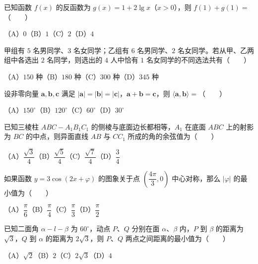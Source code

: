 \begin{question}
已知函数 $f(x)$ 的反函数为 $g(x)=1+2\lg x$（$x>0$），则 $f(1)+g(1)=$\mbox{（　　）}

（A）$0$\quad（B）$1$\quad（C）$2$\quad（D）$4$

\end{question}
\begin{question}
甲组有 $5$ 名男同学、$3$ 名女同学；乙组有 $6$ 名男同学、$2$ 名女同学。若从甲、乙两组中各选出 $2$ 名同学，则选出的 $4$ 人中恰有 $1$ 名女同学的不同选法共有\mbox{（　　）}

（A）$150$ 种\quad（B）$180$ 种\quad（C）$300$ 种\quad（D）$345$ 种

\end{question}
\begin{question}
设非零向量 $\boldsymbol a,\boldsymbol b,\boldsymbol c$ 满足 $|\boldsymbol a|=|\boldsymbol b|=|\boldsymbol c|$，$\boldsymbol a+\boldsymbol b=\boldsymbol c$，则 $\langle\boldsymbol a,\boldsymbol b\rangle=$\mbox{（　　）}

（A）$150^\circ$\quad（B）$120^\circ$\quad（C）$60^\circ$\quad（D）$30^\circ$

\end{question}
\begin{question}
已知三棱柱 $ABC-A_1B_1C_1$ 的侧棱与底面边长都相等，$A_1$ 在底面 $ABC$ 上的射影为 $BC$ 的中点，则异面直线 $AB$ 与 $CC_1$ 所成的角的余弦值为\mbox{（　　）}

（A）$\dfrac{\sqrt3}{4}$\quad（B）$\dfrac{\sqrt5}{4}$\quad（C）$\dfrac{\sqrt7}{4}$\quad（D）$\dfrac34$

\end{question}
\begin{question}
如果函数 $y=3\cos(2x+\varphi)$ 的图象关于点 $\left(\dfrac{4\pi}{3},0\right)$ 中心对称，那么 $|\varphi|$ 的最小值为\mbox{（　　）}

（A）$\dfrac\pi6$\quad（B）$\dfrac\pi4$\quad（C）$\dfrac\pi3$\quad（D）$\dfrac\pi2$

\end{question}
\begin{question}
已知二面角 $\alpha-l-\beta$ 为 $60^\circ$，动点 $P\text{、}Q$ 分别在面 $\alpha\text{、}\beta$ 内，$P$ 到 $\beta$ 的距离为 $\sqrt3$，$Q$ 到 $\alpha$ 的距离为 $2\sqrt3$，则 $P\text{、}Q$ 两点之间距离的最小值为\mbox{（　　）}

（A）$\sqrt2$\quad（B）$2$\quad（C）$2\sqrt3$\quad（D）$4$

\end{question}
